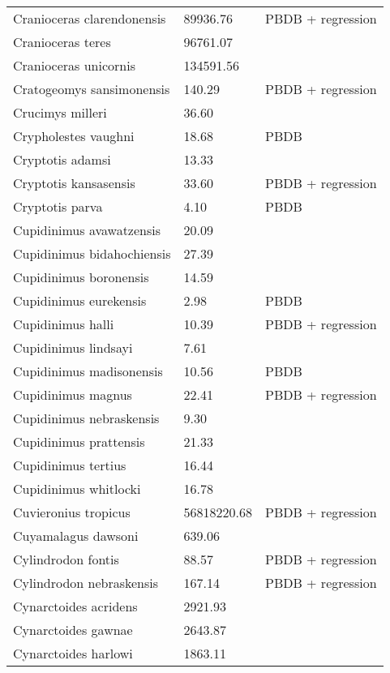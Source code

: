 \begin{center}
\begin{longtable}{p{} p{} p{} }
  Cranioceras clarendonensis & 89936.76 & PBDB + regression \\ 
  Cranioceras teres & 96761.07 & \cite{Tomiya2013} \\ 
  Cranioceras unicornis & 134591.56 & \cite{Tomiya2013} \\ 
  Cratogeomys sansimonensis & 140.29 & PBDB + regression \\ 
  Crucimys milleri & 36.60 & \cite{Tomiya2013} \\ 
  Crypholestes vaughni & 18.68 & PBDB \\ 
  Cryptotis adamsi & 13.33 & \cite{Tomiya2013} \\ 
  Cryptotis kansasensis & 33.60 & PBDB + regression \\ 
  Cryptotis parva & 4.10 & PBDB \\ 
  Cupidinimus avawatzensis & 20.09 & \cite{Tomiya2013} \\ 
  Cupidinimus bidahochiensis & 27.39 & \cite{Tomiya2013} \\ 
  Cupidinimus boronensis & 14.59 & \cite{Tomiya2013} \\ 
  Cupidinimus eurekensis & 2.98 & PBDB \\ 
  Cupidinimus halli & 10.39 & PBDB + regression \\ 
  Cupidinimus lindsayi & 7.61 & \cite{Tomiya2013} \\ 
  Cupidinimus madisonensis & 10.56 & PBDB \\ 
  Cupidinimus magnus & 22.41 & PBDB + regression \\ 
  Cupidinimus nebraskensis & 9.30 & \cite{Tomiya2013} \\ 
  Cupidinimus prattensis & 21.33 & \cite{Tomiya2013} \\ 
  Cupidinimus tertius & 16.44 & \cite{Tomiya2013} \\ 
  Cupidinimus whitlocki & 16.78 & \cite{Tomiya2013} \\ 
  Cuvieronius tropicus & 56818220.68 & PBDB + regression \\ 
  Cuyamalagus dawsoni & 639.06 & \cite{Tomiya2013} \\ 
  Cylindrodon fontis & 88.57 & PBDB + regression \\ 
  Cylindrodon nebraskensis & 167.14 & PBDB + regression \\ 
  Cynarctoides acridens & 2921.93 & \cite{Tomiya2013} \\ 
  Cynarctoides gawnae & 2643.87 & \cite{Tomiya2013} \\ 
  Cynarctoides harlowi & 1863.11 & \cite{Tomiya2013} \\ 

\end{longtable}
\end{center}
